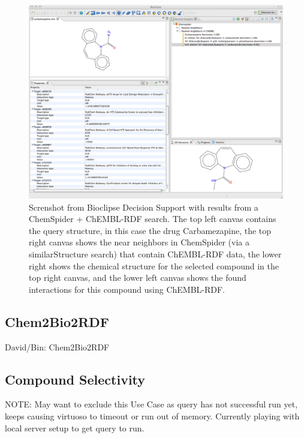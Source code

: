 \documentclass[10pt]{bmc_article}
\newenvironment{bmcformat}{\begin{raggedright}\baselineskip20pt\sloppy\setboolean{publ}{false}}{\end{raggedright}\baselineskip20pt\sloppy}
\begin{document}
\begin{bmcformat}
\begin{figure}[!ht]
		\begin{center}
		\includegraphics[width=15cm]{bioclipse-ds.png}
		\newline
		\caption[wee]{Screnshot from Bioclipse Decision Support with results from a ChemSpider + ChEMBL-RDF search. The top left canvas contains the query structure, in this case the drug Carbamezapine, the top right canvas shows the near neighbors in ChemSpider (via a similarStructure search) that contain ChEMBL-RDF data, the lower right shows the chemical structure for the selected compound in the top right canvas, and the lower left canvas shows the found interactions for this compound using ChEMBL-RDF.}
	\label{fig:bioclipse-ds}
		\end{center}
\end{figure}


\subsection*{Chem2Bio2RDF}

David/Bin: Chem2Bio2RDF

\subsection*{Compound Selectivity}

NOTE: May want to exclude this Use Case as query has not successful run yet, keeps causing virtuoso 
to timeout or run out of memory. Currently playing with local server setup to get query to run.


\end{bmcformat}
\end{document}
